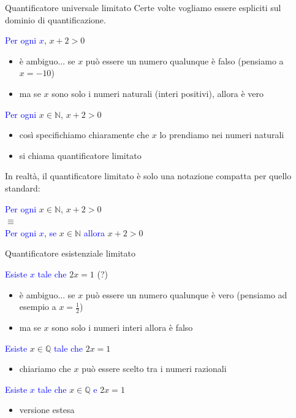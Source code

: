\documentclass[aspectratio=169,10pt]{beamer}
\newcommand{\conn}[1]{\textcolor{blue}{#1}}
\newcommand{\quant}[1]{\textcolor{blue}{#1}}
\begin{document}
\begin{frame}{Quantificatore universale limitato}
    Certe volte vogliamo essere espliciti sul dominio di quantificazione.
    \begin{example}
        \quant{Per ogni $x$}, $x + 2 > 0$ \pause
        \begin{itemize}
        \item è ambiguo... se $x$ può essere un numero qualunque è falso (pensiamo a $x=-10$)
        \item ma se $x$ sono solo i numeri naturali (interi positivi), allora è vero
        \end{itemize}
        \pause
        \quant{Per ogni} $x \in \mathbb{N}$, $x + 2 > 0$ \pause
        \begin{itemize}
            \item così specifichiamo chiaramente che $x$ lo prendiamo nei numeri naturali
            \item si chiama \alert{quantificatore limitato}
        \end{itemize}
    \end{example}
    In realtà, il quantificatore limitato è solo una notazione compatta per quello standard:
    \begin{example}
        \quant{Per ogni} $x \in \mathbb{N}$, $x + 2 > 0$ \\
        \medskip
        \hspace{2cm}$\equiv$\\
        \medskip
        \quant{Per ogni $x$}, \quant{se} $x \in \mathbb{N}$ \quant{allora} $x + 2 > 0$
    \end{example}
\end{frame}

\begin{frame}{Quantificatore esistenziale limitato}
    \begin{example}
        \quant{Esiste $x$ tale che} $2x = 1$ \pause (?)
        \begin{itemize}
        \item è ambiguo... se $x$ può essere un numero qualunque è vero (pensiamo ad esempio a $x=\frac{1}{2}$)
        \item ma se $x$ sono solo i numeri interi allora è falso
        \end{itemize}
        \quant{Esiste} $x \in \mathbb{Q}$ \quant{tale che} $2x = 1$
        \begin{itemize}
            \item chiariamo che $x$ può essere scelto tra i numeri razionali
        \end{itemize}
        \quant{Esiste $x$ tale che} $x \in \mathbb{Q}$ \conn{e} $2x=1$
        \begin{itemize}
            \item versione estesa
        \end{itemize}
    \end{example}
\end{frame}
\end{document}
